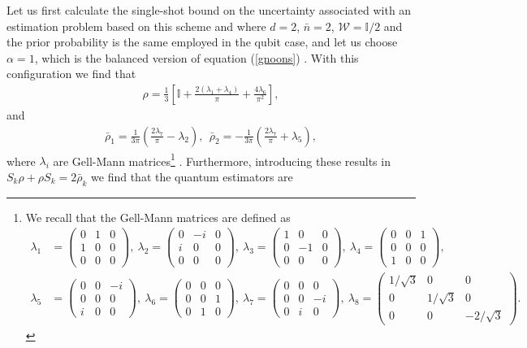 Let us first calculate the single-shot bound on the uncertainty associated with an estimation problem based on this scheme and where $d = 2$, $\bar{n} = 2$, $\mathcal{W} = \mathbb{I}/2$ and the prior probability is the same employed in the qubit case, and let us choose $\alpha = 1$, which is the balanced version of equation (\ref{gnoons}) \cite{knott2016local}. With this configuration we find that 
\begin{eqnarray}
\rho = \frac{1}{3}\left[\mathbb{I} + \frac{2(\lambda_1 + \lambda_4)}{\pi} + \frac{4\lambda_6}{\pi^2} \right],
\end{eqnarray}
and
\begin{eqnarray}
\bar{\rho}_1 = \frac{1}{3\pi}\left(\frac{2\lambda_7}{\pi}-\lambda_2\right),~~\bar{\rho}_2 = -\frac{1}{3\pi}\left(\frac{2\lambda_7}{\pi}+\lambda_5\right),
\end{eqnarray}
where $\lambda_i$ are Gell-Mann matrices\footnote{We recall that the Gell-Mann matrices are defined as \cite{gellmann1962}
\begin{align}
\lambda_1 &=
\begin{pmatrix}
0 & 1 & 0 \\
1 & 0 & 0 \\
0 & 0 & 0
\end{pmatrix},~
\lambda_2 = 
\begin{pmatrix}
0 & -i & 0 \\
i & 0 & 0 \\
0 & 0 & 0
\end{pmatrix},~
\lambda_3 = 
\begin{pmatrix}
1 & 0 & 0 \\
0 & -1 & 0 \\
0 & 0 & 0
\end{pmatrix},~
\lambda_4 =
\begin{pmatrix}
0 & 0 & 1 \\
0 & 0 & 0 \\
1 & 0 & 0
\end{pmatrix},
\nonumber \\
\lambda_5 &= 
\begin{pmatrix}
0 & 0 & -i \\
0 & 0 & 0 \\
i & 0 & 0
\end{pmatrix},~
\lambda_6 = 
\begin{pmatrix}
0 & 0 & 0 \\
0 & 0 & 1 \\
0 & 1 & 0
\end{pmatrix},~
\lambda_7 = 
\begin{pmatrix}
0 & 0 & 0 \\
0 & 0 & -i \\
0 & i & 0
\end{pmatrix},~
\lambda_8 = 
\begin{pmatrix}
1/\sqrt{3} & 0 & 0 \\
0 & 1/\sqrt{3} & 0 \\
0 & 0 & -2/\sqrt{3}
\end{pmatrix}.
\nonumber
\end{align}} \cite{gellmann1962}. Furthermore, introducing these results in $S_k\rho + \rho S_k = 2\bar{\rho}_k$ we find that the quantum estimators are
